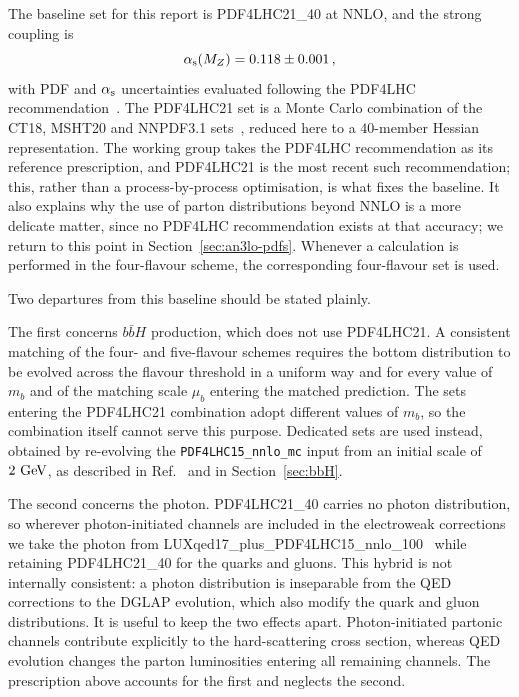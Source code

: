 The baseline set for this report is PDF4LHC21\_40 at NNLO, and the strong
coupling is
\begin{equation}
    \alpha_{\mathrm{s}}(M_Z)=0.118\pm0.001\,,
\end{equation}
with PDF and $\alpha_{\mathrm{s}}$ uncertainties evaluated following the PDF4LHC
recommendation~\cite{PDF4LHCWorkingGroup:2022cjn}. The PDF4LHC21 set is a Monte Carlo
combination of the CT18, MSHT20 and NNPDF3.1
sets~\cite{Hou:2019efy,Bailey:2020ooq,NNPDF:2017mvq}, reduced here to a
$40$-member Hessian representation. The working group takes the PDF4LHC
recommendation as its reference prescription, and PDF4LHC21 is the most recent
such recommendation; this, rather than a process-by-process optimisation, is
what fixes the baseline. It also explains why the use of parton distributions
beyond NNLO is a more delicate matter, since no PDF4LHC recommendation exists
at that accuracy; we return to this point in Section~\ref{sec:an3lo-pdfs}.
Whenever a calculation is performed in the four-flavour scheme, the
corresponding four-flavour set is used.

Two departures from this baseline should be stated plainly.

The first concerns $b\bar bH$ production, which does not use PDF4LHC21. A
consistent matching of the four- and five-flavour schemes requires the bottom
distribution to be evolved across the flavour threshold in a uniform way and
for every value of $m_b$ and of the matching scale $\mu_b$ entering the
matched prediction. The sets entering the PDF4LHC21 combination adopt
different values of $m_b$, so the combination itself cannot serve this purpose.
Dedicated sets are used instead, obtained by re-evolving the
\texttt{PDF4LHC15\_nnlo\_mc} input from an initial scale of $2~\mathrm{GeV}$, as
described in Ref.~\cite{Bonvini:2016fgf} and in Section~\ref{sec:bbH}.

The second concerns the photon. PDF4LHC21\_40 carries no photon distribution,
so wherever photon-initiated channels are included in the electroweak
corrections we take the photon from
LUXqed17\_plus\_PDF4LHC15\_nnlo\_100~\cite{Manohar:2017eqh} while retaining
PDF4LHC21\_40 for the quarks and gluons. This hybrid is not internally
consistent: a photon distribution is inseparable from the QED corrections to
the DGLAP evolution, which also modify the quark and gluon distributions. It is
useful to keep the two effects apart. Photon-initiated partonic channels
contribute explicitly to the hard-scattering cross section, whereas QED
evolution changes the parton luminosities entering all remaining channels. The
prescription above accounts for the first and neglects the second.

